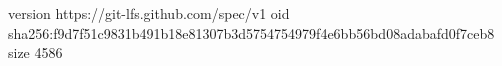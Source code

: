 version https://git-lfs.github.com/spec/v1
oid sha256:f9d7f51c9831b491b18e81307b3d5754754979f4e6bb56bd08adabafd0f7ceb8
size 4586
